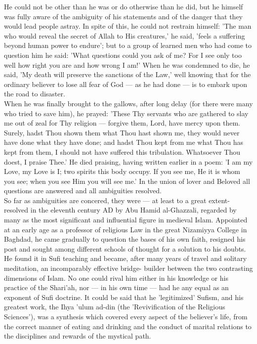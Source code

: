 \documentclass[11pt, b5paper, twoside]{book}
\begin{document}
He could not be other than he was or do otherwise than he did, but he himself was fully aware of the 
ambiguity of his statements and of the danger that they would lead people astray. In spite of this, 
he could not restrain himself: 'The man who would reveal the secret of Allah to His creatures,' he 
said, 'feels a suffering beyond human power to endure'; but to a group of learned men who had come to 
question him he said: 'What questions could you ask of me? For I see only too well how right you are 
and how wrong I am!' When he was condemned to die, he said, 'My death will preserve the sanctions of 
the Law,' well knowing that for the ordinary believer to lose all fear of God --- as he had done --- is 
to embark upon the road to disaster. \\

When he was finally brought to the gallows, after long delay (for there were many who tried to save 
him), he prayed: 'These Thy servants who are gathered to slay me out of zeal for Thy religion --- 
forgive them, Lord, have mercy upon them. Surely, hadst Thou shown them what Thou hast shown me, they 
would never have done what they have done; and hadst Thou kept from me what Thou has kept from them, 
I should not have suffered this tribulation. Whatsoever Thou doest, I praise Thee.' He died praising, 
having written earlier in a poem: 'I am my Love, my Love is I; two spirits this body occupy. If you 
see me, He it is whom you see; when you see Him you will see me.' In the union of lover and Beloved 
all questions are answered and all ambiguities resolved. \\

So far as ambiguities are concered, they were --- at least to a great extent-resolved in the eleventh 
century AD by Abu Hamid al-Ghazzali, regarded by many as the most significant and influential figure 
in medieval Islam. Appointed at an early age as a professor of religious Law in the great Nizamiyya 
College in Baghdad, he came gradually to question the bases of his own faith, resigned his post and 
sought among different schools of thought for a solution to his doubts. He found it in Sufi teaching 
and became, after many years of travel and solitary meditation, an incomparably effective bridge-
builder between the two contrasting dimensions of Islam. No one could rival him either in his 
knowledge or his practice of the Shari'ah, nor --- in his own time --- had he any equal as an exponent of 
Sufi doctrine. It could be said that he 'legitimized' Sufism, and his greatest work, the Ihya 'ulum 
ad-din (the 'Revivification of the Religious Sciences'), was a synthesis which covered every aspect 
of the believer's life, from the correct manner of eating and drinking and the conduct of marital 
relations to the disciplines and rewards of the mystical path. \\
\end{document}
